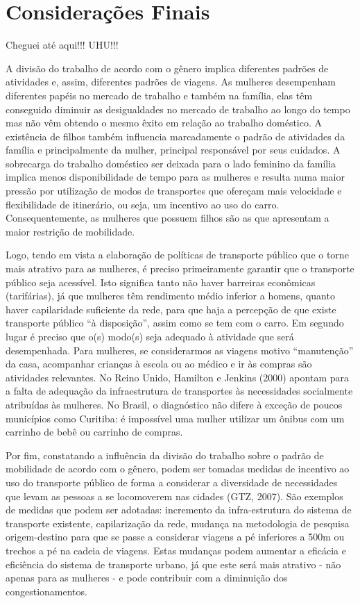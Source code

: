 \chapter{Considerações Finais}\label{chap:considfinais}

Cheguei até aqui!!! UHU!!!


A divisão do trabalho de acordo com o gênero implica diferentes padrões de atividades e, assim, diferentes padrões de viagens. As mulheres desempenham diferentes papéis no mercado de trabalho e também na família, elas têm conseguido diminuir as desigualdades no mercado de trabalho ao longo do tempo mas não vêm obtendo o mesmo êxito em relação ao trabalho doméstico. A existência de filhos também influencia marcadamente o padrão de atividades da família e principalmente da mulher, principal responsável por seus cuidados. A sobrecarga do trabalho doméstico ser deixada para o lado feminino da família implica menos disponibilidade de tempo para as mulheres e resulta numa maior pressão por utilização de modos de transportes que ofereçam mais velocidade e flexibilidade de itinerário, ou seja, um incentivo ao uso do carro. Consequentemente, as mulheres que possuem filhos são as que apresentam a maior restrição de mobilidade.

Logo, tendo em vista a elaboração de políticas de transporte público que o torne mais atrativo para as mulheres, é preciso primeiramente garantir que o transporte público seja acessível. Isto significa tanto não haver barreiras econômicas (tarifárias), já que mulheres têm rendimento médio inferior a homens, quanto haver capilaridade suficiente da rede, para que haja a percepção de que existe transporte público ``à disposição'', assim como se tem com o carro. Em segundo lugar é preciso que o(s) modo(s) seja adequado à atividade que será desempenhada. Para mulheres, se considerarmos as viagens motivo ``manutenção'' da casa, acompanhar crianças à escola ou ao médico e ir às compras são atividades relevantes. No Reino Unido, Hamilton e Jenkins (2000) apontam para a falta de adequação da infraestrutura de transportes às necessidades socialmente atribuídas às mulheres. No Brasil, o diagnóstico não difere à exceção de poucos municípios como Curitiba: é impossível uma mulher utilizar um ônibus com um carrinho de bebê ou carrinho de compras. 

Por fim, constatando a influência da divisão do trabalho sobre o padrão de mobilidade de acordo com o gênero, podem ser tomadas medidas de incentivo ao uso do transporte público de forma a considerar a diversidade de necessidades que levam as pessoas a se locomoverem nas cidades (GTZ, 2007). São exemplos de medidas que podem ser adotadas: incremento da infra-estrutura do sistema de transporte existente, capilarização da rede, mudança na metodologia de pesquisa origem-destino para que se passe a considerar viagens a pé inferiores a 500m ou trechos a pé na cadeia de viagens. Estas mudanças podem aumentar a eficácia e eficiência do sistema de transporte urbano, já que este será mais atrativo - não apenas para as mulheres - e pode contribuir com a diminuição dos congestionamentos.